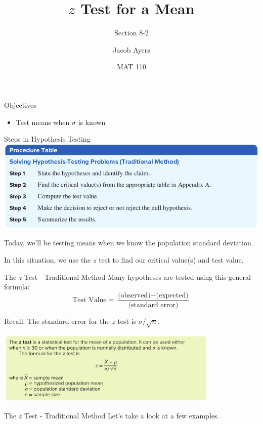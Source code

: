 \documentclass[t, aspectratio=169]{beamer}
\title[8-2]{$z$ Test for a Mean}
\subtitle{Section 8-2}
\author{Jacob Ayers}
\institute{Lesson \#25}
\date{MAT 110}
\newcommand{\?}{\stackrel{?}{=}}
\begin{document}
	
	\begin{frame}
		\titlepage
	\end{frame}
	
	\begin{frame}{Objectives}
		\begin{itemize}
			\item Test means when $\sigma$ is known
		\end{itemize}
	\end{frame}

	\begin{frame}{Steps in Hypothesis Testing}
		\includegraphics[width=\textwidth]{hyp-process.png} \pause
		
		Today, we'll be testing means when we know the population standard deviation. \pause
		
		In this situation, we use the $z$ test to find our critical value(s) and test value.
	\end{frame}

	\begin{frame}{The $z$ Test - Traditional Method}
		Many hypotheses are tested using this general formula: $$\text{Test Value} = \dfrac{\text{(observed)} - \text{(expected)}}{\text{(standard error)}}$$ \pause
		
		Recall: The standard error for the $z$ test is $\sigma / \sqrt{n}$. \pause
		
		\includegraphics[width=0.8\textwidth]{z-formula.png}
	\end{frame}

	\begin{frame}{The $z$ Test - Traditional Method}
		Let's take a look at a few examples.
	\end{frame}
\end{document}
